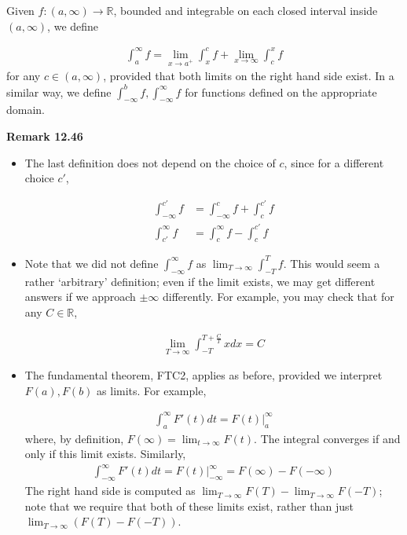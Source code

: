\documentclass[11pt]{article}
\begin{document}
Given $f: (a, \infty) \to \mathbb{R}$, bounded and integrable on each closed interval inside $(a, \infty)$, we define

\begin{align*}
    \int_a^\infty f = \lim_{x \to a^+} \int_x^c f + \lim_{x \to \infty} \int_c^x f
\end{align*}
for any $c \in (a, \infty)$, provided that both limits on the right hand side exist. In a similar way, we define $\int_{-\infty}^b f, \int_{-\infty}^{\infty} f$ for functions defined on the appropriate domain.

\textbf{Remark 12.46} 
\begin{itemize}
    \item The last definition does not depend on the choice of $c$, since for a different choice $c'$, 
    
    \begin{align*}
    \int_{-\infty}^{c'} f &= \int_{-\infty}^c f + \int_c^{c'} f \\
    \int_{c'}^{\infty} f &= \int_c^{\infty} f - \int_c^{c'} f
    \end{align*}
    
    \item Note that we did not define $\int_{-\infty}^{\infty} f$ as $\lim_{T \to \infty} \int_{-T}^{T} f$. This would seem a rather `arbitrary' definition; even if the limit exists, we may get different answers if we approach $\pm \infty$ differently. For example, you may check that for any $C \in \mathbb{R}$, 
    
    \begin{align*}
        \lim_{T \to \infty} \int_{-T}^{T+\frac{C}{T}} x dx = C
    \end{align*}
    
    \item The fundamental theorem, FTC2, applies as before, provided we interpret $F(a), F(b)$ as limits. For example, 
    
    \begin{align*}
    \int_a^{\infty} F'(t) dt = F(t) \Big|_a^{\infty}
    \end{align*}
    where, by definition, $F(\infty) = \lim_{t \to \infty} F(t)$. The integral converges if and only if this limit exists. Similarly, 
    \begin{align*}
        \int_{-\infty}^\infty F'(t) dt = F(t) \Big|_{-\infty}^\infty = F(\infty) - F(-\infty)
    \end{align*}
    The right hand side is computed as $\lim_{T \to \infty} F(T) - \lim_{T \to \infty} F(-T)$; note that we require that both of these limits exist, rather than just $\lim_{T \to \infty} (F(T) - F(-T))$. 
\end{itemize}
\end{document}
